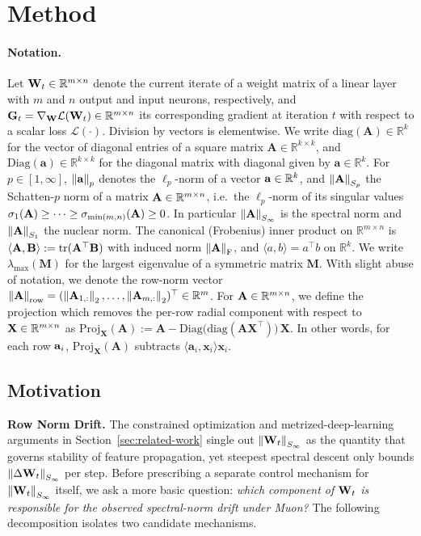 \documentclass{article}
\begin{document}
\section{Method}
\label{sec:method}

\paragraph{Notation.} Let $\mathbf{W}_t \in \mathbb{R}^{m \times n}$ denote the current iterate of a weight matrix of a linear layer with $m$ and $n$ output and input neurons, respectively, and $\mathbf{G}_t = \nabla_{\mathbf{W}} \mathcal{L}(\mathbf{W}_t) \in \mathbb{R}^{m \times n}$ its corresponding gradient at iteration $t$ with respect to a scalar loss $\mathcal{L}(\cdot)$. Division by vectors is elementwise. We write $\mathrm{diag}(\mathbf{A})\in\mathbb{R}^{k}$ for the vector of diagonal entries of a square matrix $\mathbf{A}\in\mathbb{R}^{k\times k}$, and $\mathrm{Diag}(\mathbf{a})\in\mathbb{R}^{k\times k}$ for the diagonal matrix with diagonal given by $\mathbf{a}\in\mathbb{R}^{k}$. For $p \in [1,\infty]$, $\left \| \mathbf{a} \right\|_p$ denotes the $\ell_p$-norm of a vector $\mathbf{a} \in \mathbb{R}^k$, and $\left \| \mathbf{A} \right\|_{S_p}$ the Schatten-$p$ norm of a matrix $\mathbf{A}\in\mathbb{R}^{m\times n}$, i.e.\ the $\ell_p$-norm of its singular values $\sigma_1(\mathbf{A})\geq\dots\geq\sigma_{\min(m,n)}(\mathbf{A})\geq 0$. In particular $\left \| \mathbf{A} \right\|_{S_\infty}$ is the spectral norm and $\left \| \mathbf{A} \right\|_{S_1}$ the nuclear norm. The canonical (Frobenius) inner product on $\mathbb{R}^{m\times n}$ is $\langle \mathbf{A},\mathbf{B}\rangle := \mathrm{tr}(\mathbf{A}^\top \mathbf{B})$ with induced norm $\left \| \mathbf{A} \right\|_{\mathrm{F}}$, and $\langle a, b \rangle = a^\top b$ on $\mathbb R^k$. We write $\lambda_{\max}(\mathbf M)$ for the largest eigenvalue of a symmetric matrix $\mathbf M$. With slight abuse of notation, we denote the row-norm vector $\left \| \mathbf{A} \right\|_{\mathrm{row}} = (\left \| \mathbf{A}_{1,:} \right\|_2, \dots, \left \| \mathbf{A}_{m, :} \right\|_2)^\top \in \mathbb R^m$. For $\mathbf{A} \in \mathbb{R}^{m \times n}$, we define the projection which removes the per-row radial component with respect to $\mathbf{X} \in \mathbb{R}^{m \times n}$ as $\mathrm{Proj}_{\mathbf{X}}(\mathbf{A}) := \mathbf{A} - \mathrm{Diag}\!\big(\mathrm{diag}(\mathbf{A}\mathbf{X}^\top)\big)\,\mathbf{X}.$ In other words, for each row $\mathbf{a}_i$, $\mathrm{Proj}_{\mathbf{X}}(\mathbf{A})$ subtracts $\langle \mathbf{a}_i,\mathbf{x}_i\rangle\mathbf{x}_i$.

\subsection{Motivation}
\label{sec:motivation}
\textbf{Row Norm Drift.} The constrained optimization and metrized-deep-learning arguments in Section~\ref{sec:related-work} single out $\left \| \mathbf{W}_t \right\|_{S_\infty}$ as the quantity that governs stability of feature propagation,
yet steepest spectral descent only bounds $\left \| \Delta\mathbf{W}_t \right\|_{S_\infty}$ per step. Before prescribing a separate control mechanism for $\left \| \mathbf{W}_t \right\|_{S_\infty}$ itself, we ask a more basic question: \emph{which component of $\mathbf{W}_t$ is responsible for the observed spectral-norm drift under Muon?} The following decomposition isolates two candidate mechanisms.
\end{document}
